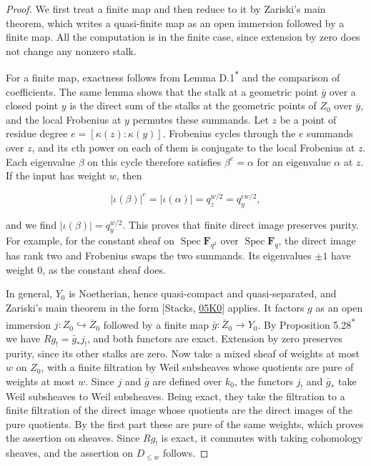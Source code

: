 \documentclass[11pt]{article}
\newcommand{\bpout}[1]{#1\textsuperscript{\hyperlink{bp-outside}{\ensuremath{\ast}}}}
\begin{document}
\begin{proof}[{Proof}]\label{bp6}%
We first treat a finite map and then reduce to it by Zariski's main theorem, which writes a quasi-finite map as an open immersion followed by a finite map. All the computation is in the finite case, since extension by zero does not change any nonzero stalk.

For a finite map, exactness follows from Lemma \bpout{D.1} and the comparison of coefficients. The same lemma shows that the stalk at a geometric point \(\bar y\) over a closed point \(y\) is the direct sum of the stalks at the geometric points of \(Z_0\) over \(\bar y\), and the local Frobenius at \(y\) permutes these summands. Let \(z\) be a point of residue degree \(e=[\kappa(z):\kappa(y)]\). Frobenius cycles through the \(e\) summands over \(z\), and its \(e\)th power on each of them is conjugate to the local Frobenius at \(z\). Each eigenvalue \(\beta\) on this cycle therefore satisfies \(\beta^e=\alpha\) for an eigenvalue \(\alpha\) at \(z\). If the input has weight \(w\), then

\[
|\iota(\beta)|^e=|\iota(\alpha)|=q_z^{w/2}=q_y^{ew/2},
\]

and we find \(|\iota(\beta)|=q_y^{w/2}\). This proves that finite direct image preserves purity. For example, for the constant sheaf on \(\operatorname{Spec}\mathbf F_{q^2}\) over \(\operatorname{Spec}\mathbf F_q\), the direct image has rank two and Frobenius swaps the two summands. Its eigenvalues \(\pm1\) have weight \(0\), as the constant sheaf does.

In general, \(Y_0\) is Noetherian, hence quasi-compact and quasi-separated, and Zariski's main theorem in the form [Stacks, \href{https://stacks.math.columbia.edu/tag/05K0}{05K0}] applies. It factors \(g\) as an open immersion \(j:Z_0\hookrightarrow\overline Z_0\) followed by a finite map \(\bar g:\overline Z_0\to Y_0\). By Proposition \bpout{5.28} we have \(Rg_!=\bar g_*j_!\), and both functors are exact. Extension by zero preserves purity, since its other stalks are zero. Now take a mixed sheaf of weights at most \(w\) on \(Z_0\), with a finite filtration by Weil subsheaves whose quotients are pure of weights at most \(w\). Since \(j\) and \(\bar g\) are defined over \(k_0\), the functors \(j_!\) and \(\bar g_*\) take Weil subsheaves to Weil subsheaves. Being exact, they take the filtration to a finite filtration of the direct image whose quotients are the direct images of the pure quotients. By the first part these are pure of the same weights, which proves the assertion on sheaves. Since \(Rg_!\) is exact, it commutes with taking cohomology sheaves, and the assertion on \(D_{\leq w}\) follows.
\end{proof}
\end{document}
